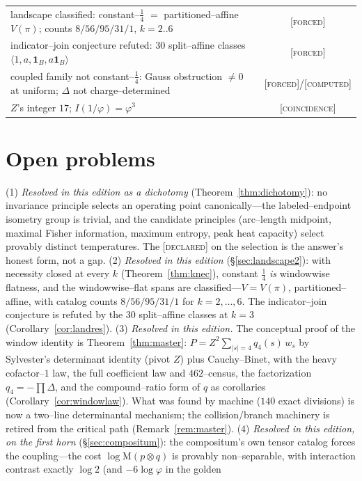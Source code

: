 \documentclass[11pt]{article}
\theoremstyle{definition}
\newcommand{\ph}{\varphi}
\newcommand{\Mah}{\mathrm{M}}
\newcommand{\forcedtag}{{\scshape [forced]}}
\newcommand{\declaredtag}{{\scshape [declared]}}
\newcommand{\computedtag}{{\scshape [computed]}}
\begin{document}
\begin{table}[h]
\begin{tabular}{lc}
landscape classified: constant--$\tfrac14$ $=$ partitioned--affine $V(\pi)$; counts $8/56/95/31/1$, $k=2..6$ & \forcedtag\\
indicator--join conjecture refuted: $30$ split--affine classes $\langle1,a,\mathbf 1_B,a\mathbf 1_B\rangle$ & \forcedtag\\
coupled family not constant--$\tfrac14$: Gauss obstruction $\ne0$ at uniform; $\Delta$ not charge--determined & \forcedtag/\computedtag\\
$Z$'s integer $17$; $I(1/\ph)=\ph^3$ & {\scshape [coincidence]}\\
\bottomrule
\end{tabular}
\end{table}

\section{Open problems}
(1) \emph{Resolved in this edition as a dichotomy} (Theorem~\ref{thm:dichotomy}): no invariance
principle selects an operating point canonically---the labeled--endpoint isometry group is trivial,
and the candidate principles (arc--length midpoint, maximal Fisher information, maximum entropy,
peak heat capacity) select provably distinct temperatures. The \declaredtag{} on the selection is
the answer's honest form, not a gap.
(2) \emph{Resolved in this edition} (\S\ref{sec:landscape2}): with necessity closed at every
$k$ (Theorem~\ref{thm:knec}), constant $\tfrac14$ \emph{is} windowwise flatness, and the
windowwise--flat spans are classified---$V=V(\pi)$, partitioned--affine, with catalog counts
$8/56/95/31/1$ for $k=2,\dots,6$. The indicator--join conjecture is refuted by the $30$
split--affine classes at $k=3$ (Corollary~\ref{cor:landres}).
(3) \emph{Resolved in this edition.} The conceptual proof of the window identity is
Theorem~\ref{thm:master}: $P=Z^2\sum_{|s|=4}q_4(s)\,w_s$ by Sylvester's determinant identity (pivot
$Z$) plus Cauchy--Binet, with the heavy cofactor--$1$ law, the full coefficient law and $462$--census,
the factorization $q_4=-\prod\Delta$, and the compound--ratio form of $q$ as corollaries
(Corollary~\ref{cor:windowlaw}). What was found by machine ($140$ exact divisions) is now a two--line
determinantal mechanism; the collision/branch machinery is retired from the critical path
(Remark~\ref{rem:master}).
(4) \emph{Resolved in this edition, on the first horn} (\S\ref{sec:compositum}): the
compositum's own tensor catalog forces the coupling---the cost $\log\Mah(p\otimes q)$ is provably
non--separable, with interaction contrast exactly $\log 2$ (and $-6\log\ph$ in the golden
\end{document}
